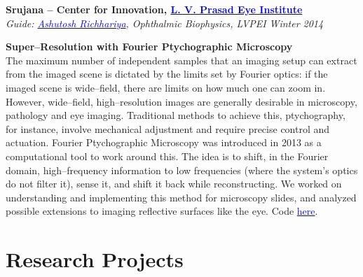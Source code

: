\documentclass[margin,line]{res}
\newenvironment{list1}{
  \begin{list}{\ding{113}}{%
      \setlength{\itemsep}{0in}
      \setlength{\parsep}{0in} \setlength{\parskip}{0in}
      \setlength{\topsep}{0in} \setlength{\partopsep}{0in} 
      \setlength{\leftmargin}{0.17in}}}{\end{list}}
\begin{document}
\begin{resume}
{\bf Srujana -- Center for Innovation, \href{http://www.lvpei.org/}{\textcolor{blue}{L. V. Prasad Eye Institute}}} \\
{\em Guide: \href{http://www.lvpei.org/our-team/our-team-ashutosh.php}{\textcolor{blue}{Ashutosh Richhariya}}, Ophthalmic Biophysics, LVPEI} \hfill {\it Winter 2014} \\
\vspace*{-.13in}
\begin{list1}
\item[]\textbf{Super--Resolution with Fourier Ptychographic Microscopy} \\
The maximum number of independent samples that an imaging setup can extract from the imaged scene is dictated by the limits set by Fourier optics: if the imaged scene is wide--field, there are limits on how much one can zoom in. However, wide--field, high--resolution images are generally desirable in microscopy, pathology and eye imaging. Traditional methods to achieve this, ptychography, for instance, involve mechanical adjustment and require precise control and actuation. Fourier Ptychographic Microscopy was introduced in 2013 as a computational tool to work around this. The idea is to shift, in the Fourier domain, high--frequency information to low frequencies (where the system's optics do not filter it), sense it, and shift it back while reconstructing. We worked on understanding and implementing this method for microscopy slides, and analyzed possible extensions to imaging reflective surfaces like the eye.
Code \href{https://github.com/alankarkotwal/lvp-imaging/tree/parallel}{\textcolor{blue} {here}}.
\end{list1}

\vspace{-.1cm}

\section{\sc Research Projects}


\end{resume}
\end{document}
